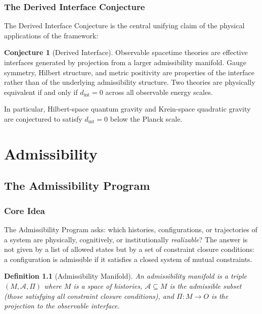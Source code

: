 \documentclass[12pt,a4paper]{book}
\newtheorem{definition}[theorem]{Definition}
\theoremstyle{remark}
\theoremstyle{definition}
\newtheorem{conjecture}{Conjecture}[chapter]
\begin{document}
\section{The Derived Interface Conjecture}

The Derived Interface Conjecture is the central unifying claim of the
physical applications of the framework:

\begin{conjecture}[Derived Interface]
Observable spacetime theories are effective interfaces generated by
projection from a larger admissibility manifold. Gauge symmetry, Hilbert
structure, and metric positivity are properties of the interface rather
than of the underlying admissibility structure. Two theories are
physically equivalent if and only if $d_{\mathrm{int}} = 0$ across all
observable energy scales.
\end{conjecture}

In particular, Hilbert-space quantum gravity and Krein-space quadratic
gravity are conjectured to satisfy $d_{\mathrm{int}} = 0$ below the
Planck scale.

\part{Admissibility}

\chapter{The Admissibility Program}

\section{Core Idea}

The Admissibility Program asks: which histories, configurations, or
trajectories of a system are physically, cognitively, or institutionally
\emph{realizable}? The answer is not given by a list of allowed states
but by a set of constraint closure conditions: a configuration is
admissible if it satisfies a closed system of mutual constraints.

\begin{definition}[Admissibility Manifold]
An \emph{admissibility manifold} is a triple $(M, \mathcal{A}, \Pi)$
where $M$ is a space of histories, $\mathcal{A} \subseteq M$ is the
admissible subset (those satisfying all constraint closure conditions),
and $\Pi : M \to O$ is the projection to the observable interface.
\end{definition}
\end{document}
